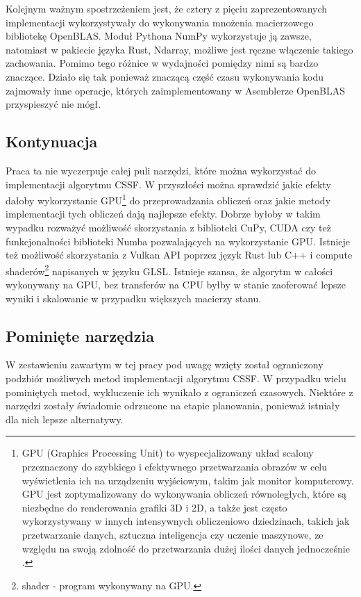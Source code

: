 \documentclass[11pt, a4paper]{article}
\begin{document}
\begin{sloppypar}
    Kolejnym ważnym spostrzeżeniem jest, że cztery z pięciu zaprezentowanych
    implementacji wykorzystywały do wykonywania mnożenia macierzowego bibliotekę
    OpenBLAS. Moduł Pythona NumPy wykorzystuje ją zawsze, natomiast w pakiecie języka
    Rust, Ndarray, możliwe jest ręczne włączenie takiego zachowania. Pomimo tego różnice
    w wydajności pomiędzy nimi są bardzo znaczące. Działo się tak ponieważ znaczącą
    część czasu wykonywania kodu zajmowały inne operacje, których zaimplementowany w Asemblerze
    OpenBLAS przyspieszyć nie mógł.

    \subsection{Kontynuacja}
    Praca ta nie wyczerpuje całej puli narzędzi, które można wykorzystać do
    implementacji algorytmu CSSF. W przyszłości można sprawdzić jakie efekty dałoby wykorzystanie
    GPU\footnote{GPU (Graphics Processing Unit) to wyspecjalizowany układ scalony
    przeznaczony do szybkiego i efektywnego przetwarzania obrazów w celu wyświetlenia
    ich na urządzeniu wyjściowym, takim jak monitor komputerowy. GPU jest
    zoptymalizowany do wykonywania obliczeń równoległych, które są niezbędne do renderowania
    grafiki 3D i 2D, a także jest często wykorzystywany w innych intensywnych
    obliczeniowo dziedzinach, takich jak przetwarzanie danych, sztuczna inteligencja czy
    uczenie maszynowe, ze względu na swoją zdolność do przetwarzania dużej ilości danych
    jednocześnie \cite{CPU_VS_GPU}.} do przeprowadzania obliczeń oraz jakie metody implementacji
    tych obliczeń dają najlepsze efekty. Dobrze byłoby w takim wypadku rozważyć
    możliwość skorzystania z biblioteki CuPy, CUDA czy też funkcjonalności biblioteki Numba
    pozwalających na wykorzystanie GPU. Istnieje też możliwość skorzystania z Vulkan API
    poprzez język Rust lub C++ i compute shaderów\footnote{shader - program wykonywany na
    GPU.} napisanych w języku GLSL. Istnieje szansa, że algorytm w całości wykonywany na
    GPU, bez transferów na CPU byłby w stanie zaoferować lepsze wyniki i skalowanie w
    przypadku większych macierzy stanu.

    \subsection{Pominięte narzędzia}
    W zestawieniu zawartym w tej pracy pod uwagę wzięty został ograniczony podzbiór
    możliwych metod implementacji algorytmu CSSF. W przypadku wielu pominiętych metod,
    wykluczenie ich wynikało z ograniczeń czasowych. Niektóre z narzędzi zostały świadomie
    odrzucone na etapie planowania, ponieważ istniały dla nich lepsze alternatywy.


\end{sloppypar}
\end{document}
